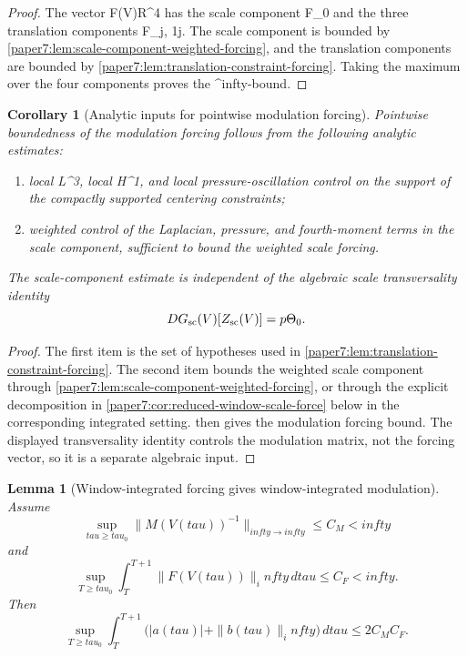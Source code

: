 \documentclass[11pt]{amsart}
\def\({}%
\def\){}%
\def\mathbb#1{#1}%
\def\tau{tau}%
\def\infty{infty}%
\theoremstyle{plain}
\newtheorem{lemma}[lemma]{Lemma}
\newtheorem{corollary}[corollary]{Corollary}
\theoremstyle{definition}
\theoremstyle{remark}
\begin{document}
\begin{proof}
The vector \(F(V)\in\mathbb R^4\) has the scale component \(F_0\) and the
three translation components \(F_j\), \(1\le j\).  The scale component is
bounded by \cref{paper7:lem:scale-component-weighted-forcing}, and the
translation components are bounded by
\cref{paper7:lem:translation-constraint-forcing}.  Taking the maximum over the
four components proves the \(\ell^\infty\)-bound.
\end{proof}

\begin{corollary}[Analytic inputs for pointwise modulation forcing]
\label{paper7:cor:pointwise-modulation-inputs}
Pointwise boundedness of the modulation forcing follows from the following
analytic estimates:
\begin{enumerate}[label=\textup{(\roman*)}]
\item local \(L^3\), local \(H^1\), and local pressure-oscillation control on
the support of the compactly supported centering constraints;
\item weighted control of the Laplacian, pressure, and fourth-moment terms in
the scale component, sufficient to bound the weighted scale forcing.
\end{enumerate}
The scale-component estimate is independent of the algebraic scale
transversality
identity
\[
  DG_{\rm sc}(V)[Z_{\rm sc}(V)]=p\Theta_0.
\]
\end{corollary}

\begin{proof}
The first item is the set of hypotheses used in
\cref{paper7:lem:translation-constraint-forcing}.  The second item bounds the
weighted scale component through \cref{paper7:lem:scale-component-weighted-forcing},
or through the explicit decomposition in
\cref{paper7:cor:reduced-window-scale-force} below in the corresponding
integrated setting.   then gives
the modulation forcing bound.  The displayed transversality identity controls
the modulation matrix, not the forcing vector, so it is a separate algebraic
input.
\end{proof}

\begin{lemma}[Window-integrated forcing gives window-integrated modulation]
\label{paper7:lem:window-l1-forcing-modulation}
Assume
\[
  \sup_{\tau\ge\tau_0}
  \|M(V(\tau))^{-1}\|_{\infty\to\infty}\le C_M<\infty
\]
and
\[
  \sup_{T\ge\tau_0}
  \int_T^{T+1}\|F(V(\tau))\|_\infty\,d\tau
  \le C_F<\infty .
\]
Then
\[
  \sup_{T\ge\tau_0}
  \int_T^{T+1}\bigl(|a(\tau)|+\|b(\tau)\|_\infty\bigr)\,d\tau
  \le 2C_MC_F.
\]
\end{lemma}
\end{document}
